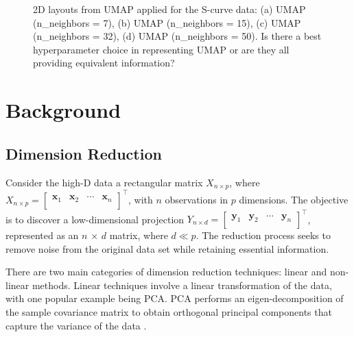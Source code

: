 \documentclass[
  12pt]{article}
\begin{document}
\begin{figure}


\caption{\label{fig-nldervisUMAP}2D layouts from UMAP applied for the
S-curve data: (a) UMAP (n\_neighbors = 7), (b) UMAP (n\_neighbors = 15),
(c) UMAP (n\_neighbors = 32), (d) UMAP (n\_neighbors = 50). Is there a
best hyperparameter choice in representing UMAP or are they all
providing equivalent information?}

\end{figure}%

\section{Background}\label{sec-background}

\subsection{Dimension Reduction}\label{dimension-reduction}

Consider the high-D data a rectangular matrix \(X_{n \times p}\), where
\(X_{n \times p} = \begin{bmatrix} \textbf{x}_{1} & \textbf{x}_{2} & \cdots & \textbf{x}_{n}\\ \end{bmatrix}^\top\),
with \(n\) observations in \(p\) dimensions. The objective is to
discover a low-dimensional projection
\(Y_{n \times d} = \begin{bmatrix} \textbf{y}_{1} & \textbf{y}_{2} & \cdots & \textbf{y}_{n}\\ \end{bmatrix}^\top\),
represented as an \(n\) × \(d\) matrix, where \(d \ll p\). The reduction
process seeks to remove noise from the original data set while retaining
essential information.

There are two main categories of dimension reduction techniques: linear
and non-linear methods. Linear techniques involve a linear
transformation of the data, with one popular example being PCA. PCA
performs an eigen-decomposition of the sample covariance matrix to
obtain orthogonal principal components that capture the variance of the
data \citep{Karl1901}.
\end{document}
